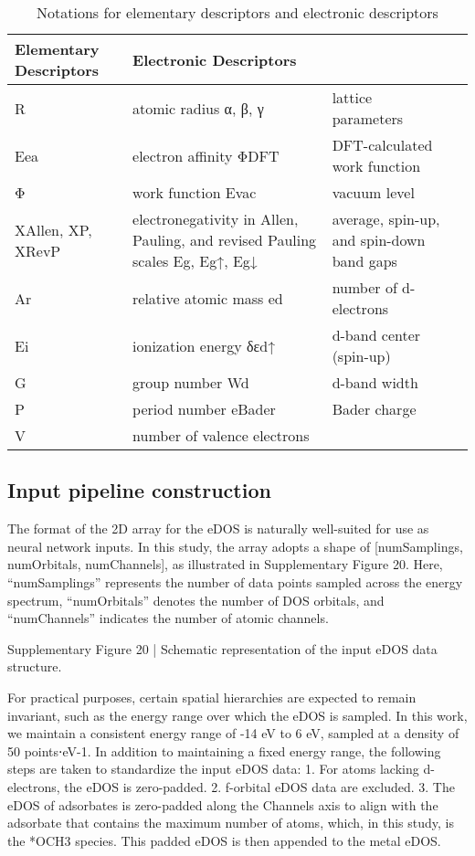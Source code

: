 \begin{table}[h]
  \centering
  \begin{tabular}{llll}
    \hline
    \textbf{Elementary Descriptors} & \textbf{Electronic Descriptors} \\
    \hline
    R                 & atomic radius \quad α, β, γ & lattice parameters \\
    Eea               & electron affinity \quad ΦDFT & DFT-calculated work function \\
    Φ                 & work function \quad Evac & vacuum level \\
    XAllen, ΧP, ΧRevP & electronegativity in Allen, Pauling, and revised Pauling scales \quad Eg, Eg↑, Eg↓ & average, spin-up, and spin-down band gaps \\
    Ar                & relative atomic mass \quad ed & number of d-electrons \\
    Ei                & ionization energy \quad δεd↑ & d-band center (spin-up) \\
    G                 & group number \quad Wd & d-band width \\
    P                 & period number \quad eBader & Bader charge \\
    V                 & number of valence electrons \\
    \hline
  \end{tabular}
  \caption{Notations for elementary descriptors and electronic descriptors}
  \label{si_table15}
\end{table}



\subsection{Input pipeline construction}
The format of the 2D array for the eDOS is naturally well-suited for use as neural network inputs. In this study, the array adopts a shape of [numSamplings, numOrbitals, numChannels], as illustrated in Supplementary Figure 20. Here, “numSamplings” represents the number of data points sampled across the energy spectrum, “numOrbitals” denotes the number of DOS orbitals, and “numChannels” indicates the number of atomic channels.


Supplementary Figure 20 | Schematic representation of the input eDOS data structure.

For practical purposes, certain spatial hierarchies are expected to remain invariant, such as the energy range over which the eDOS is sampled.
In this work, we maintain a consistent energy range of -14 eV to 6 eV, sampled at a density of 50 points⋅eV-1.
In addition to maintaining a fixed energy range, the following steps are taken to standardize the input eDOS data:
  1.	For atoms lacking d-electrons, the eDOS is zero-padded.
  2.	f-orbital eDOS data are excluded.
  3.	The eDOS of adsorbates is zero-padded along the Channels axis to align with the adsorbate that contains the maximum number of atoms, which, in this study, is the *OCH3 species. This padded eDOS is then appended to the metal eDOS.

